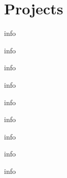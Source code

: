 \documentclass[letterpaper]{resume} %
\begin{document}
\begin{minipage}[t]{0.75\textwidth}


	\section{Projects}

	\begin{tightitemize}
		\item info
		\item info
		\item info
	\end{tightitemize}

	\sectionspace %


	\begin{tightitemize}
		\item info
		\item info
		\item info
	\end{tightitemize}

	\sectionspace %


	\begin{tightitemize}
		\item info
		\item info
		\item info
	\end{tightitemize}



\end{minipage} %

\updateinfo
\end{document}
